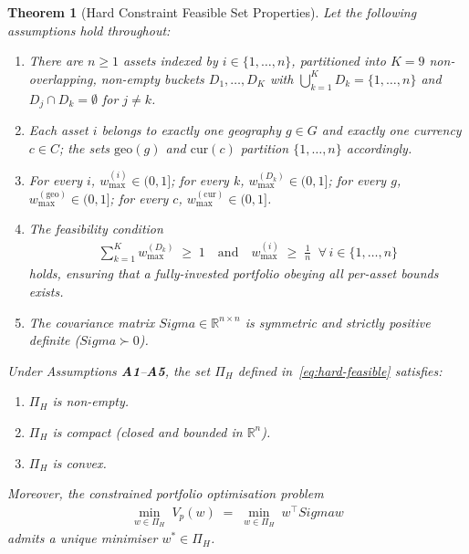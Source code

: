\documentclass[12pt,openany]{book}
\newcommand{\R}{\mathbb{R}}
\newcommand{\bfw}{\mathbf{w}}
\newcommand{\bfSigma}{\boldsymbol{\Sigma}}
\newcommand{\calD}{\mathcal{D}}
\numberwithin{equation}{chapter}
\theoremstyle{plain}
\newtheorem{theorem}{Theorem}[chapter]
\theoremstyle{definition}
\theoremstyle{remark}
\def\calD{D}%
\def\mathcal#1{#1}%
\def\bfw{w}%
\def\bfSigma{Sigma}%
\begin{document}
\begin{theorem}[Hard Constraint Feasible Set Properties]
\label{thm:hard-constraint}
Let the following assumptions hold throughout:
\begin{enumerate}
  \item[\textbf{A1.}] There are $n \geq 1$ assets indexed by
        $i \in \{1,\ldots,n\}$, partitioned into $K = 9$ non-overlapping,
        non-empty buckets $\calD_1,\ldots,\calD_K$ with
        $\bigcup_{k=1}^{K}\calD_k = \{1,\ldots,n\}$ and
        $\calD_j \cap \calD_k = \emptyset$ for $j \neq k$.
  \item[\textbf{A2.}] Each asset $i$ belongs to exactly one
        geography $g \in \mathcal{G}$ and exactly one currency
        $c \in \mathcal{C}$; the sets $\mathrm{geo}(g)$ and
        $\mathrm{cur}(c)$ partition $\{1,\ldots,n\}$ accordingly.
  \item[\textbf{A3.}] For every $i$, $w_{\max}^{(i)} \in (0,1]$;
        for every $k$, $w_{\max}^{(\calD_k)} \in (0,1]$;
        for every $g$, $w_{\max}^{(\mathrm{geo})} \in (0,1]$;
        for every $c$, $w_{\max}^{(\mathrm{cur})} \in (0,1]$.
  \item[\textbf{A4.}] The feasibility condition
        \begin{align}
          \sum_{k=1}^{K} w_{\max}^{(\calD_k)} \;\geq\; 1
          \quad\text{and}\quad
          w_{\max}^{(i)} \;\geq\; \frac{1}{n}
          \;\;\forall\, i \in \{1,\ldots,n\}
          \label{eq:hc-condition}
        \end{align}
        holds, ensuring that a fully-invested portfolio obeying all
        per-asset bounds exists.
  \item[\textbf{A5.}] The covariance matrix $\bfSigma \in \R^{n \times n}$
        is symmetric and strictly positive definite ($\bfSigma \succ 0$).
\end{enumerate}
Under Assumptions \textbf{A1}--\textbf{A5}, the set $\Pi_H$
defined in~\eqref{eq:hard-feasible} satisfies:
\begin{enumerate}
  \item $\Pi_H$ is non-empty.
  \item $\Pi_H$ is compact (closed and bounded in $\R^n$).
  \item $\Pi_H$ is convex.
\end{enumerate}
Moreover, the constrained portfolio optimisation problem
\begin{align}
  \min_{\bfw \in \Pi_H} \; V_p(\bfw)
  \;=\;
  \min_{\bfw \in \Pi_H} \; \bfw^{\top}\bfSigma\bfw
  \label{eq:hc-opt}
\end{align}
admits a \emph{unique} minimiser $\bfw^* \in \Pi_H$.
\end{theorem}
\end{document}
